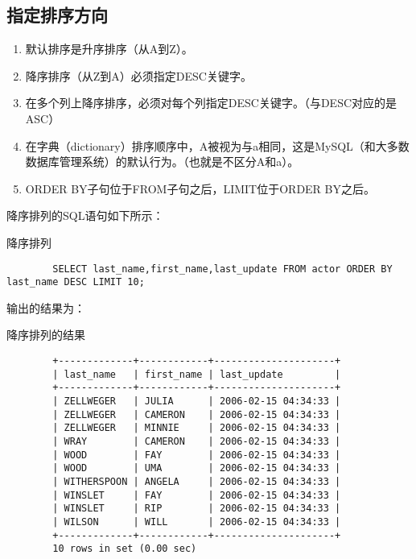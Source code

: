 \documentclass[UTF8]{article}
\begin{document}
\subsection{指定排序方向}
\begin{orangebox}[frametitle={Tips 5.3}]
    \begin{enumerate}
        \item 默认排序是升序排序（从A到Z）。
        \item 降序排序（从Z到A）必须指定DESC关键字。
        \item 在多个列上降序排序，必须对每个列指定DESC关键字。（与DESC对应的是ASC）
        \item 在字典（dictionary）排序顺序中，A被视为与a相同，这是MySQL（和大多数数据库管理系统）的默认行为。（也就是不区分A和a）。
        \item ORDER BY子句位于FROM子句之后，LIMIT位于ORDER BY之后。
    \end{enumerate}
\end{orangebox}
降序排列的SQL语句如下所示：
\begin{listing}[H]
	\caption{降序排列}
	\label{code:descsorder}
	\begin{verbatim}
        SELECT last_name,first_name,last_update FROM actor ORDER BY last_name DESC LIMIT 10;
    \end{verbatim}
\end{listing}

输出的结果为：

\begin{listing}[H]
	\caption{降序排列的结果}
	\label{code:descsorderresult}
	\begin{verbatim}
        +-------------+------------+---------------------+
        | last_name   | first_name | last_update         |
        +-------------+------------+---------------------+
        | ZELLWEGER   | JULIA      | 2006-02-15 04:34:33 |
        | ZELLWEGER   | CAMERON    | 2006-02-15 04:34:33 |
        | ZELLWEGER   | MINNIE     | 2006-02-15 04:34:33 |
        | WRAY        | CAMERON    | 2006-02-15 04:34:33 |
        | WOOD        | FAY        | 2006-02-15 04:34:33 |
        | WOOD        | UMA        | 2006-02-15 04:34:33 |
        | WITHERSPOON | ANGELA     | 2006-02-15 04:34:33 |
        | WINSLET     | FAY        | 2006-02-15 04:34:33 |
        | WINSLET     | RIP        | 2006-02-15 04:34:33 |
        | WILSON      | WILL       | 2006-02-15 04:34:33 |
        +-------------+------------+---------------------+
        10 rows in set (0.00 sec)
\end{verbatim}
\end{listing}
\end{document}
